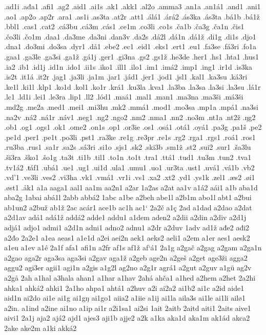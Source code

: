 .ad1i
.ađa1
.afi1
.ag2
.aid1
.ai1s
.ak1
.akk1
.al2o
.amma3
.an1a
.an1á1
.and1
.ani1
.ao1
.ap2o
.ap2r
.ara1
.as1i
.as3ta
.at2r
.att1
.álá1
.árá2
.ás3ka
.ás3ta
.bá1b
.bá1ž
.bbl1
.cas1
.cat2
.cá3bu
.cá3m
.cás1
.ce1m
.co3li
.co1s
.ča1b
.ča3g
.ča1n
.čis1
.čo3li
.čo1m
.daa1
.da3me
.da3ni
.dan3v
.da2s
.dá2l
.dá1n
.dá1ž
.di1g
.di1s
.djo1
.dna1
.do3mi
.do3sa
.dyr1
.då1
.ebe2
.ec1
.eid1
.eks1
.ert1
.eu1
.fa3se
.fá3ri
.fo1a
.gaa1
.ga3le
.ga3si
.ga1ž
.gá1j
.ger1
.gi3na
.gs2
.gs1ž
.he3de
.her1
.hs1
.hta1
.hus1
.ia2
.ib1
.id1j
.id1n
.ido1
.ii1s
.iko1
.ill1
.ilo1
.im1
.imá2
.imp1
.ing1
.ir1d
.is3ka
.is2t
.it1á
.it2r
.jag1
.ja3li
.ja1m
.jar1
.jád1
.jer1
.jod1
.jsl1
.kal1
.ka3su
.ká3ri
.ke1l
.ki1l
.klp1
.ko1d
.kol1
.ko1r
.krá1
.ku3la
.kva1
.la3ba
.la3sa
.la3si
.la3su
.lá1r
.lc1
.ld1i
.lei1
.le3ra
.lip1
.ll2
.lód1
.maá1
.mal1
.man1
.ma3na
.ma3ši
.má3ši
.md2g
.me2a
.med1
.mei1
.mi3hu
.mk2
.mmá1
.mod1
.mo3sa
.mp1a
.mpá1
.na3si
.na2v
.ná2
.ná1r
.náv1
.neg1
.ng2
.ngo2
.nm2
.nma1
.nn2
.no3m
.nt1a
.nt2ž
.ŋg2
.ob1
.og1
.ogs1
.ok1
.ome2
.on1s
.op1
.or3ie
.os1
.osá1
.otá1
.oyá1
.pa3g
.pa1š
.pe2
.pe1d
.per1
.pe1t
.po3li
.pst1
.ra3ke
.re1g
.re3pr
.re1s
.rg2
.rga1
.rgs1
.roá1
.ros1
.ru3ba
.rus1
.sa1r
.sa2s
.sá3ri
.si1o
.sjs1
.sk2
.ski3b
.sm1ž
.st2
.sui2
.sur1
.ša3lu
.ši3ra
.ško1
.šo1g
.ta3t
.ti1b
.til1
.to1n
.to1t
.tra1
.ttá1
.tud1
.tu3m
.tun2
.tva1
.tv1á2
.ŧáf1
.ubá1
.ue1
.ug1
.ui1d
.ula1
.umu1
.uo1
.ur3ta
.ust1
.uvá1
.vá1b
.vb2
.vd'1
.ve3li
.ves2
.vi3ha
.vk1
.vmá1
.vr1i
.vs1
.xa2
.xt2
.yd1
.ys1k
.zel1
.æs2
.øi1
.øst1
.åk1
a1a
aaga1
aal1
aa1m
aa2n1
a2ar
1a2as
a2at
aa1v
a1á2
aái1
a1b
aba1d
aba2g
1abai
abá1l
2abb
abbá2
1abc
a1be
a2beh
abe1l
a2b1m
abo1l
abt1
a2bui
ab1un2
a2buž
ab1ž
2ac
acár1
ace1b
ac1h
ac1`
2a2č
a1ç
2ad
a1dad
a2dao
a2dat
a2d1av
adá1
adá1ž
addá2
adde1
addu1
a1dem
aden2
a2dii
a2din
a2div
a2d1j
adjá1
adjo1
admi1
a2d1n
adni1
adno2
adnu1
a2dr
a2duv
1adv
ad1ž
ađe2
ađi2
a2đo
2a2e1
a1ea
aeas1
a1e1d
a2ei
aei2n
aek1
aeks2
aeli1
a2em
a1er
aes1
aesk2
a1eu
a1ev
a1é
2a1f
afa1
afi1n
a2fr
af1s
af1ž
af`á1
2a1g
a2gač
a2gag
a2gam
a2ga1n
a2gao
aga2r
aga3sa
aga3si
a2gav
aga1ž
a2geb
age2n
a2geš
a2get
age3ži
agga2
aggu2
agi3er
agii1
agi1n
a2gis
a1g2l
ag2no
a2g1r
agrá1
a2gut
a2guv
a1gü
ag2v
a2gå
2ah
a1hal
a3hala
ahan1
a1har
a1hav
2ahá
ahča1
a1hed
a2hem
a2het
2a2hi
ahka1
ahká2
ahki1
2a1ho
ahpa1
ahtá1
a2huv
a2i
ai2a2
ai1b2
ai1c
a2id
aide1
aid1n
ai2do
ai1e
ai1g
ai1gŋ
ai1go1
aiia2
a1iie
a1ij
ai1la
aila3s
ai1le
ai1li
ailø1
a2in.
a1ind
a2ine
ai1no
a1ip
ai1r
a2i1sa1
ai2si
1ait
2aitb
2aitd
aiti1
2aits
aive1
aivi1
2a1j
aja2
ajá2
ajd1
ajes3
aji1b
ajje2
a2k
a1ka
aka1d
aka1m
ak1ád
akca2
2ake
ake2m
a1ki
akká2
